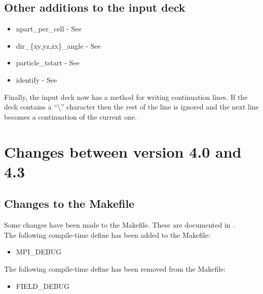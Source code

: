 \subsection{Other additions to the input deck}

\begin{itemize}
\item npart\_per\_cell - See 
\item dir\_\{xy,yz,zx\}\_angle - See 
\item particle\_tstart - See 
\item identify - See 
\end{itemize}

Finally, the input deck now has a method for writing continuation lines.
If the deck contains a ``\textbackslash'' character then the rest of the line
is ignored and the next line becomes a continuation of the current one.


\section{Changes between version 4.0 and 4.3}

\subsection{Changes to the Makefile}

Some changes have been made to the Makefile. These are documented in
.\\

\noindent The following compile-time define has been added to the Makefile:
\begin{itemize}
\item MPI\_DEBUG
\end{itemize}
\bigskip

\noindent The following compile-time define has been removed from the Makefile:
\begin{itemize}
\item FIELD\_DEBUG
\end{itemize}


